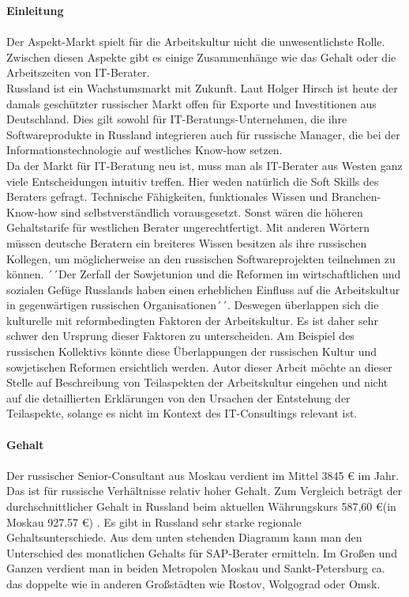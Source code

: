 	\textbf{Einleitung}\\ \\
	Der Aspekt-Markt spielt für die Arbeitskultur nicht die unwesentlichste Rolle. Zwischen diesen Aspekte gibt es einige Zusammenhänge wie das Gehalt oder die Arbeitszeiten von IT-Berater.\\
	Russland ist ein Wachstumsmarkt mit Zukunft. Laut Holger Hirsch ist heute der damals geschützter russischer Markt offen für Exporte und Investitionen aus Deutschland. Dies gilt sowohl für IT-Beratungs-Unternehmen, die ihre Softwareprodukte in Russland integrieren auch für russische Manager, die bei der Informationstechnologie auf westliches Know-how setzen.\cite{ITConsRu}\\
	Da der Markt für IT-Beratung neu ist, muss man als IT-Berater aus Westen ganz viele Entscheidungen intuitiv treffen. Hier weden natürlich die Soft Skills des Beraters gefragt. Technische Fähigkeiten, funktionales Wissen und Branchen-Know-how sind selbstverständlich vorausgesetzt. Sonst wären die höheren Gehaltstarife für westlichen Berater ungerechtfertigt. Mit anderen Wörtern müssen deutsche Beratern ein breiteres Wissen besitzen als ihre russischen Kollegen, um möglicherweise an den russischen Softwareprojekten teilnehmen zu können. ´´Der Zerfall der Sowjetunion und die Reformen im wirtschaftlichen und sozialen Gefüge Russlands haben einen erheblichen Einfluss auf die Arbeitskultur in gegenwärtigen russischen Organisationen´´\cite{ProzessbeglBerRU}.
	Deswegen überlappen sich die kulturelle mit reformbedingten Faktoren der Arbeitskultur. Es ist daher sehr schwer den Ursprung dieser Faktoren zu unterscheiden. Am Beispiel des russischen Kollektivs könnte diese Überlappungen der russischen Kultur und sowjetischen Reformen ersichtlich werden. Autor dieser Arbeit möchte an dieser Stelle auf Beschreibung von Teilaspekten der Arbeitskultur eingehen und nicht auf die detaillierten Erklärungen von den Ursachen der Entstehung der Teilaspekte, solange es nicht im Kontext des IT-Consultings relevant ist.\\ \\
	\textbf{Gehalt}\\ 
	\\
	Der russischer Senior-Consultant aus Moskau verdient im Mittel 3845 € im Jahr. Das ist für russische Verhältnisse relativ hoher Gehalt. Zum Vergleich beträgt der durchschnittlicher Gehalt in Russland beim aktuellen Währungskurs 587,60 €(in Moskau 927.57 €) \cite{RusGehAllgm}. Es gibt  in Russland sehr starke regionale Gehaltsunterschiede. Aus dem unten stehenden Diagramm kann man den Unterschied des monatlichen Gehalts für SAP-Berater ermitteln. Im Großen und Ganzen verdient man in beiden Metropolen Moskau und Sankt-Petersburg ca. das doppelte wie in anderen Großstädten wie Rostov, Wolgograd oder Omsk.
